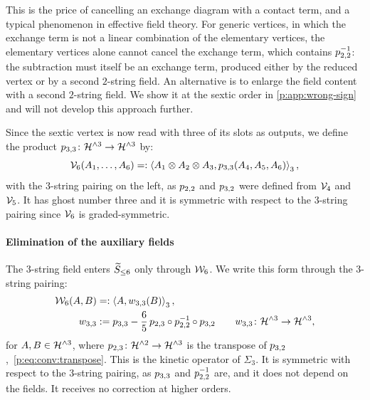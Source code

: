 This is the price of cancelling an exchange diagram with a contact term, and a typical phenomenon in effective field theory.
For generic vertices, in which the exchange term is not a linear combination of the elementary vertices, the elementary vertices alone cannot cancel the exchange term, which contains $\sprod{2}{2}^{-1}$: the subtraction must itself be an exchange term, produced either by the reduced vertex or by a second $2$-string field.
An alternative is to enlarge the field content with a second $2$-string field.
  We show it at the sextic order in \cref{p:app:wrong-sign} and will not develop this approach further.

Since the sextic vertex is now read with three of its slots as outputs, we define the product $\sprod{3}{3} \colon \Hn{3} \to \Hn{3}$ by:
\begin{equation}
  \label{p:eq:hs6:p33}
  \vertex{6}(A_1, \ldots, A_6)
    =: \pair[3]{A_1 \otimes A_2 \otimes A_3}{\sprod{3}{3}(A_4, A_5, A_6)},
\end{equation}
with the $3$-string pairing on the left, as $\sprod{2}{2}$ and $\sprod{3}{2}$ were defined from $\vertex{4}$ and $\vertex{5}$.
It has ghost number three and it is symmetric with respect to the $3$-string pairing since $\vertex{6}$ is graded-symmetric.


\paragraph{Elimination of the auxiliary fields}
\label{p:sec:hs:sextic:eom}

The $3$-string field enters $\caction[\le 6]$ only through $\dvertex{6}$.
We write this form through the $3$-string pairing:
\begin{equation}
  \label{p:eq:hs6:kinetic}
  \begin{aligned}
    \dvertex{6}(A, B)
      &
      =: \pair[3]{A}{\wprod{3}{3}(B)},
    \\
    \wprod{3}{3}
      &
      := \sprod{3}{3} - \frac{6}{5} \, \sprod{2}{3} \circ \sprod{2}{2}^{-1} \circ \sprod{3}{2}
    \qquad
    \wprod{3}{3} \colon \Hn{3} \to \Hn{3},
  \end{aligned}
\end{equation}
for $A, B \in \Hn{3}$, where $\sprod{2}{3} \colon \Hn{2} \to \Hn{3}$ is the transpose of $\sprod{3}{2}$,~\eqref{p:eq:conv:transpose}.
This is the kinetic operator of $\Sigma_3$.
It is symmetric with respect to the $3$-string pairing, as $\sprod{3}{3}$ and $\sprod{2}{2}^{-1}$ are, and it does not depend on the fields.
It receives no correction at higher orders.

